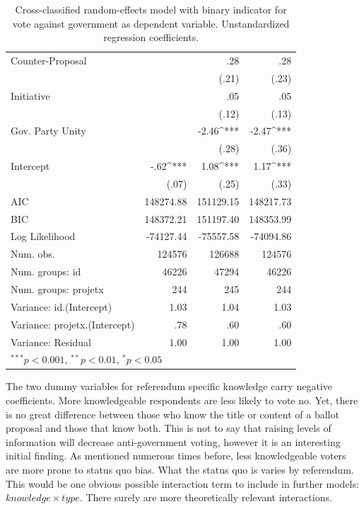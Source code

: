 \documentclass[11pt,a4paper]{article}\usepackage[]{graphicx}\usepackage[]{color}
\begin{document}
\begin{table}[htb]
\begin{tabular}{l D{.}{.}{6.5}@{} D{.}{.}{6.5}@{} D{.}{.}{6.5}@{} }
\quad Counter-Proposal        &            & .28         & .28         \\
                              &            & (.21)       & (.23)       \\
\quad Initiative              &            & .05         & .05         \\
                              &            & (.12)       & (.13)       \\
\quad Gov. Party Unity        &            & -2.46^{***} & -2.47^{***} \\
                              &            & (.28)       & (.36)       \\
Intercept                     & -.62^{***} & 1.08^{***}  & 1.17^{***}  \\
                              & (.07)      & (.25)       & (.33)       \\
\midrule
AIC                           & 148274.88  & 151129.15   & 148217.73   \\
BIC                           & 148372.21  & 151197.40   & 148353.99   \\
Log Likelihood                & -74127.44  & -75557.58   & -74094.86   \\
Num. obs.                     & 124576     & 126688      & 124576      \\
Num. groups: id               & 46226      & 47294       & 46226       \\
Num. groups: projetx          & 244        & 245         & 244         \\
Variance: id.(Intercept)      & 1.03       & 1.04        & 1.03        \\
Variance: projetx.(Intercept) & .78        & .60         & .60         \\
Variance: Residual            & 1.00       & 1.00        & 1.00        \\
\bottomrule
{}
\end{tabular}

    \caption{Cross-classified random-effects model with binary indicator for vote against government as dependent variable. Unstandardized regression coefficients.}\label{tab:regtable}
    \end{table}
    
    The two dummy variables for referendum specific knowledge carry negative coefficients. More knowledgeable respondents are less likely to vote no. Yet, there is no great difference between those who know the title or content of a ballot proposal and those that know both. This is not to say that raising levels of information will decrease anti-government voting, however it is an interesting initial finding. As mentioned numerous times before, less knowledgeable voters are more prone to status quo bias. What the status quo is varies by referendum. This would be one obvious possible interaction term to include in further models: $knowledge \times type$. There surely are more theoretically relevant interactions. 
    
\end{document}
